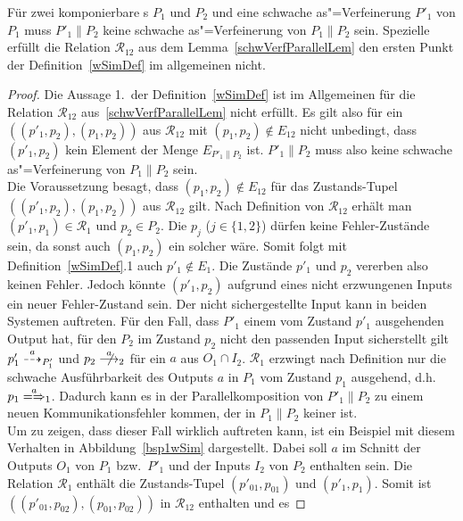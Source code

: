 \begin{Prop}
  \label{schwVerfParallelProp}
  Für zwei komponierbare \MEIO{}s $P_1$ und $P_2$ und eine schwache
  as"=Verfeinerung $P'_1$ von $P_1$ muss $P'_1\|P_2$ keine schwache
  as"=Verfeinerung von $P_1\|P_2$ sein. Spezielle erfüllt die Relation
  $\mathcal{R}_{12}$ aus dem Lemma~\ref{schwVerfParallelLem} den ersten Punkt
  der Definition~\ref{wSimDef} im allgemeinen nicht.
\end{Prop}
\begin{proof}
  Die Aussage 1.\ der Definition~\ref{wSimDef} ist im Allgemeinen für die
  Relation $\mathcal{R}_{12}$ aus~\ref{schwVerfParallelLem} nicht erfüllt. Es
  gilt also für ein $((p'_1,p_2),(p_1,p_2))$ aus $\mathcal{R}_{12}$ mit
  $(p_1,p_2)\notin E_{12}$ nicht unbedingt, dass $(p'_1,p_2)$ kein Element der
  Menge $E_{P'_1\|P_2}$ ist. $P'_1\|P_2$ muss also keine schwache
  as"=Verfeinerung von $P_1\|P_2$ sein.\\
  Die Voraussetzung besagt, dass $(p_1,p_2)\notin E_{12}$ für das
  Zustands-Tupel $((p'_1,p_2),(p_1,p_2))$ aus $\mathcal{R}_{12}$ gilt. Nach
  Definition von $\mathcal{R}_{12}$ erhält man $(p'_1,p_1)\in\mathcal{R}_1$ und
  $p_2\in P_2$. Die $p_j$ ($j\in\{1,2\}$) dürfen keine Fehler-Zustände sein, da
  sonst auch $(p_1,p_2)$ ein solcher wäre. Somit folgt mit
  Definition~\ref{wSimDef}.1 auch $p'_1\notin E_1$. Die Zustände $p'_1$ und
  $p_2$ vererben also keinen Fehler. Jedoch könnte $(p'_1,p_2)$ aufgrund eines
  nicht erzwungenen Inputs ein neuer Fehler-Zustand sein. Der nicht
  sichergestellte Input kann in beiden Systemen auftreten. Für den Fall, dass
  $P'_1$ einem vom Zustand $p'_1$ ausgehenden Output hat, für den $P_2$ im
  Zustand $p_2$ nicht den passenden Input sicherstellt gilt
  $p'_1\may[a]_{P'_1}$ und $p_2\nmust[a]_2$ für ein $a$ aus $O_1\cap I_2$.
  $\mathcal{R}_1$ erzwingt nach Definition nur die schwache Ausführbarkeit des
  Outputs $a$ in $P_1$ vom Zustand $p_1$ ausgehend, d.h.\ $p_1 \weakmay[a]_1$.
  Dadurch kann es in der Parallelkomposition von $P'_1\|P_2$ zu einem neuen
  Kommunikationsfehler kommen, der in $P_1\|P_2$ keiner ist.\\
  Um zu zeigen, dass dieser Fall wirklich auftreten kann, ist ein Beispiel mit
  diesem Verhalten in Abbildung~\ref{bsp1wSim} dargestellt. Dabei soll $a$ im
  Schnitt der Outputs $O_1$ von $P_1$ bzw.\ $P'_1$ und der Inputs $I_2$ von
  $P_2$ enthalten sein. Die Relation $\mathcal{R}_1$ enthält die Zustands-Tupel
  $(p'_{01},p_{01})$ und $(p'_1,p_1)$. Somit ist
  $((p'_{01},p_{02}),(p_{01},p_{02}))$ in $\mathcal{R}_{12}$ enthalten und es

\end{proof}
